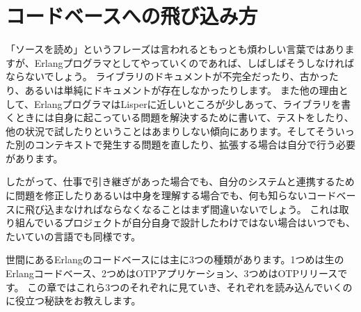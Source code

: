 \chapter{コードベースへの飛び込み方}
\label{chap:how-to-dive-into-a-code-base}

「ソースを読め」というフレーズは言われるともっとも煩わしい言葉ではありますが、Erlangプログラマとしてやっていくのであれば、しばしばそうしなければならないでしょう。
ライブラリのドキュメントが不完全だったり、古かったり、あるいは単純にドキュメントが存在しなかったりします。
また他の理由として、ErlangプログラマはLisperに近しいところが少しあって、ライブラリを書くときには自身に起こっている問題を解決するために書いて、テストをしたり、他の状況で試したりということはあまりしない傾向にあります。そしてそういった別のコンテキストで発生する問題を直したり、拡張する場合は自分で行う必要があります。

したがって、仕事で引き継ぎがあった場合でも、自分のシステムと連携するために問題を修正したりあるいは中身を理解する場合でも、何も知らないコードベースに飛び込まなければならなくなることはまず間違いないでしょう。
これは取り組んでいるプロジェクトが自分自身で設計したわけではない場合はいつでも、たいていの言語でも同様です。

世間にあるErlangのコードベースには主に3つの種類があります。1つめは生のErlangコードベース、2つめはOTPアプリケーション、3つめはOTPリリースです。
この章ではこれら3つのそれぞれに見ていき、それぞれを読み込んでいくのに役立つ秘訣をお教えします。

